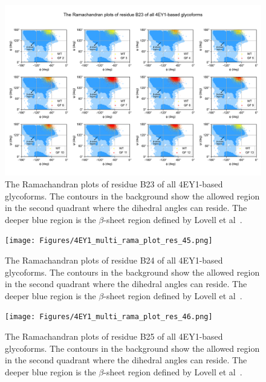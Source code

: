 \documentclass[sn-vancouver]{sn-jnl}
\begin{document}
\renewcommand{\thefigure}{S\arabic{figure}}
\begin{figure}[H]
\centering
\includegraphics[width=\textwidth]{Figures/4EY1_multi_rama_plot_res_44.png}
\caption{The Ramachandran plots of residue B23 of all 4EY1-based glycoforms. The contours in the background show the allowed region in the second quadrant where the dihedral angles can reside. The deeper blue region is the $\beta$-sheet region defined by Lovell et al~\cite{lovell2003structure}.}
\end{figure}

\renewcommand{\thefigure}{S\arabic{figure}}
\begin{figure}[H]
\centering
\texttt{[image: Figures/4EY1\_multi\_rama\_plot\_res\_45.png]}
\caption{The Ramachandran plots of residue B24 of all 4EY1-based glycoforms. The contours in the background show the allowed region in the second quadrant where the dihedral angles can reside. The deeper blue region is the $\beta$-sheet region defined by Lovell et al~\cite{lovell2003structure}.}
\end{figure}

\renewcommand{\thefigure}{S\arabic{figure}}
\begin{figure}[H]
\centering
\texttt{[image: Figures/4EY1\_multi\_rama\_plot\_res\_46.png]}
\caption{The Ramachandran plots of residue B25 of all 4EY1-based glycoforms. The contours in the background show the allowed region in the second quadrant where the dihedral angles can reside. The deeper blue region is the $\beta$-sheet region defined by Lovell et al~\cite{lovell2003structure}.}
\end{figure}
\end{document}
